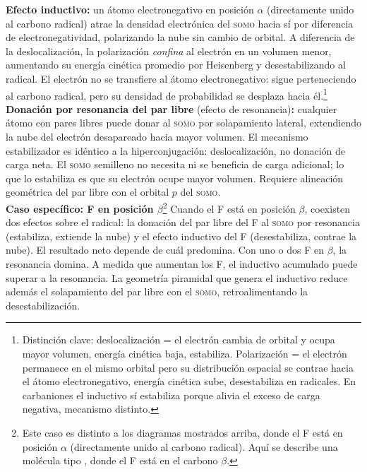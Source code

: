 \textbf{Efecto inductivo:} un átomo electronegativo en posición $\alpha$ (directamente unido al
carbono radical) atrae la densidad electrónica del \textsc{somo} hacia sí por diferencia de
electronegatividad, polarizando la nube sin cambio de orbital. A diferencia de la deslocalización,
la polarización \textit{confina} al electrón en un volumen menor, aumentando su energía cinética
promedio por Heisenberg y desestabilizando al radical. El electrón no se transfiere al átomo
electronegativo: sigue perteneciendo al carbono radical, pero su densidad de probabilidad se
desplaza hacia él.\footnote{Distinción clave: deslocalización = el electrón cambia de orbital y
ocupa mayor volumen, energía cinética baja, estabiliza. Polarización = el electrón permanece en el
mismo orbital pero su distribución espacial se contrae hacia el átomo electronegativo, energía
cinética sube, desestabiliza en radicales. En carbaniones el inductivo sí estabiliza porque alivia
el exceso de carga negativa, mecanismo distinto.} \\

\textbf{Donación por resonancia del par libre} (efecto de resonancia)\textbf{:} cualquier átomo
con pares libres puede donar al \textsc{somo} por solapamiento lateral, extendiendo la nube del
electrón desapareado hacia mayor volumen. El mecanismo estabilizador es idéntico a la
hiperconjugación: deslocalización, no donación de carga neta. El \textsc{somo} semilleno no
necesita ni se beneficia de carga adicional; lo que lo estabiliza es que su electrón ocupe mayor
volumen. Requiere alineación geométrica del par libre con el orbital $p$ del \textsc{somo}. \\

\textbf{Caso específico: F en posición $\beta$}\footnote{Este caso es distinto a los diagramas
mostrados arriba, donde el F está en posición $\alpha$ (directamente unido al carbono radical).
Aquí se describe una molécula tipo , donde el F está en el carbono
$\beta$.} Cuando el F está en posición $\beta$, coexisten dos efectos sobre el radical: la
donación del par libre del F al \textsc{somo} por resonancia (estabiliza, extiende la nube) y el
efecto inductivo del F (desestabiliza, contrae la nube). El resultado neto depende de cuál predomina.
Con uno o dos F en $\beta$, la resonancia domina. A medida que aumentan los F, el inductivo
acumulado puede superar a la resonancia. La geometría piramidal que genera el inductivo reduce
además el solapamiento del par libre con el \textsc{somo}, retroalimentando la desestabilización. \\

